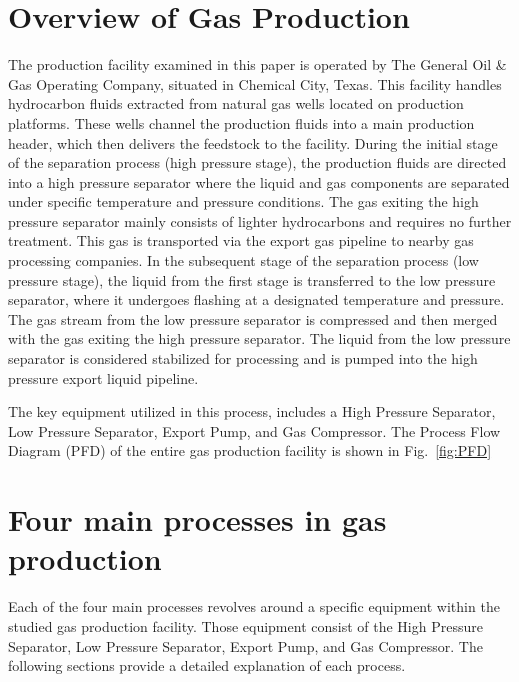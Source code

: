\documentclass[conference]{IEEEtran}
\begin{document}
\section{Overview of Gas Production}

The production facility examined in this paper is operated by The General Oil \& Gas Operating Company, situated in Chemical City, Texas. This facility handles hydrocarbon fluids extracted from natural gas wells located on production platforms. These wells channel the production fluids into a main production header, which then delivers the feedstock to the facility. During the initial stage of the separation process (high pressure stage), the production fluids are directed into a high pressure separator where the liquid and gas components are separated under specific temperature and pressure conditions. The gas exiting the high pressure separator mainly consists of lighter hydrocarbons and requires no further treatment. This gas is transported via the export gas pipeline to nearby gas processing companies. In the subsequent stage of the separation process (low pressure stage), the liquid from the first stage is transferred to the low pressure separator, where it undergoes flashing at a designated temperature and pressure. The gas stream from the low pressure separator is compressed and then merged with the gas exiting the high pressure separator. The liquid from the low pressure separator is considered stabilized for processing and is pumped into the high pressure export liquid pipeline.

The key equipment utilized in this process, includes a High Pressure Separator, Low Pressure Separator, Export Pump, and Gas Compressor. The Process Flow Diagram (PFD) of the entire gas production facility is shown in Fig.~\ref{fig:PFD}



\section{Four main processes in gas production}
Each of the four main processes revolves around a specific equipment within the studied gas production facility. Those equipment consist of the High Pressure Separator, Low Pressure Separator, Export Pump, and Gas Compressor. The following sections provide a detailed explanation of each process.
\end{document}
